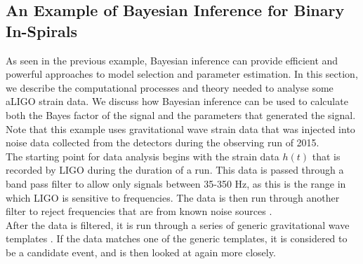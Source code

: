 \documentclass{article}
\begin{document}
 \subsection{An Example of Bayesian Inference for Binary In-Spirals}
 
 As seen in the previous example, Bayesian inference can provide efficient and powerful approaches to model selection and parameter estimation. In this section, we describe the computational processes and theory needed to analyse some aLIGO strain data. We discuss how Bayesian inference can be used to calculate both the Bayes factor of the signal and the parameters that generated the signal. Note that this example uses gravitational wave strain data that was injected into noise data collected from the detectors during the observing run of 2015.\\
 


The starting point for data analysis begins with the strain data $h(t)$ that is recorded by LIGO during the duration of a run. This data is passed through a band pass filter to allow only signals between 35-350 Hz, as this is the range in which LIGO is sensitive to frequencies. The data is then run through another filter to reject frequencies that are from known noise sources \cite{ligo2016properties}. \\


After the data is filtered, it is run through a series of generic gravitational wave templates \cite{abbott2016observing}. If the data matches one of the generic templates, it is considered to be a candidate event, and is then looked at again more closely. \\


 
\end{document}
